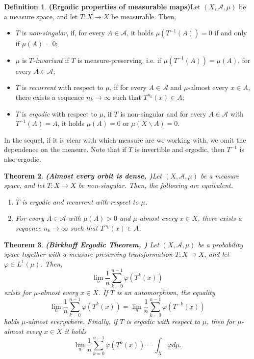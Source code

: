 \documentclass[11pt]{article}
\newtheorem{thm}{Theorem}[section]
\theoremstyle{definition}
\newtheorem{defi}[thm]{Definition}
\theoremstyle{remark}
\theoremstyle{plain}
\begin{document}
\begin{defi}{\bf (Ergodic properties of measurable maps)}\label{def-ergodic-properties} Let $ (X,\mathcal{A}, \mu) $ be a measure space, and let $ T\colon X\to X $ be measurable. Then,\begin{itemize}
			\item $ T $ is {\em non-singular}, if, for every $ A\in\mathcal{A} $, it holds $ \mu (T^{-1}(A))=0 $ if and only if  $ \mu (A)=0 $;
		\item $ \mu $ is {\em $ T $-invariant} if $ T $ is measure-preserving, i.e. if $ \mu (T^{-1}(A))=\mu (A) $, for every $ A\in\mathcal{A} $;
		\item $ T $ is {\em recurrent} with respect to $ \mu $, if for every  $ A\in\mathcal{A} $ and $ \mu $-almost every $ x\in A $, there exists a sequence $ n_k\to \infty $ such that $ T^{n_k}(x)\in A $;
		\item $ T $ is {\em ergodic} with respect to $ \mu $, if $ T $ is non-singular and for every $ A\in\mathcal{A} $ with $ T^{-1}(A)=A $, it holds $ \mu(A)=0$ or $ \mu (X\smallsetminus A)=0 $.
	\end{itemize}
\end{defi}
In the sequel, if it is clear with which measure are we working with, we omit the dependence on the measure. Note that if $ T $ is invertible and ergodic, then $ T^{-1} $ is also ergodic.

\begin{thm}{\bf (Almost every orbit is dense, {\normalfont\cite[Prop. 1.2.2]{Aaronson97}})}\label{thm-almost-every-orbit-dense}
	Let $ (X,\mathcal{A}, \mu) $ be a measure space, and let $ T\colon X\to X $ be non-singular. Then, the following are equivalent.\begin{enumerate}[label={\em (\alph*)}]
		\item $ T $ is ergodic and recurrent with respect to $ \mu $.
		\item\label{thm-orbitesdenses-b}  For every  $ A\in\mathcal{A} $ with $ \mu (A)>0 $ and $ \mu $-almost every $ x\in X $, there exists a sequence $ n_k\to \infty $ such that $ T^{n_k}(x)\in A $.
	\end{enumerate}
\end{thm}

\begin{thm}{\bf (Birkhoff Ergodic Theorem, {\normalfont \cite[Sect. 4.1]{KatokHasselblat}})} \label{thm-birkhoff} Let $ (X,\mathcal{A},\mu) $ be a probability space together with a measure-preserving transformation $ T\colon X\to X $, and let $ \varphi\in L^1(\mu) $. Then, \[\lim\limits_{n}\frac{1}{n}\sum_{k=0}^{n-1}\varphi(T^k(x))\] exists for $ \mu $-almost every $ x\in X $. If $ T $ is an automorphism, the equality \[\lim\limits_{n}\frac{1}{n}\sum_{k=0}^{n-1}\varphi(T^k(x))=\lim\limits_{n}\frac{1}{n}\sum_{k=0}^{n-1}\varphi(T^{-k}(x))\] holds $ \mu $-almost everywhere.
	 Finally, if $ T $ is ergodic with respect to $ \mu $, then for $ \mu $-almost every $ x\in X $ it holds \[\lim\limits_{n}\frac{1}{n}\sum_{k=0}^{n-1}\varphi(T^k(x))=\int_X\varphi  d\mu.\]
\end{thm}
\end{document}
